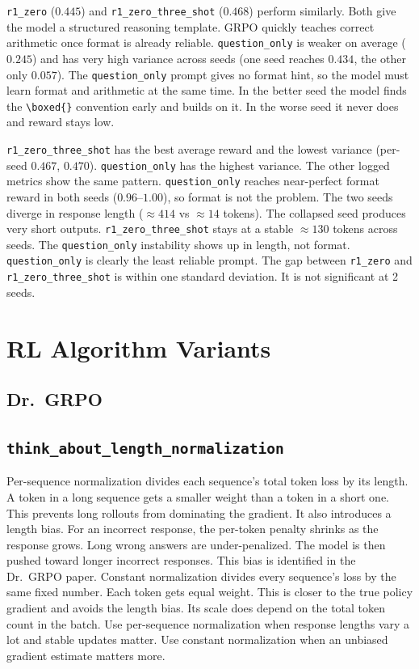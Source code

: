 \documentclass[11pt]{article}
\newcommand{\problemid}[1]{\subsection*{\nolinkurl{#1}}}
\begin{document}
\texttt{r1\_zero} ($0.445$) and \texttt{r1\_zero\_three\_shot} ($0.468$) perform
similarly. Both give the model a structured reasoning template. GRPO quickly
teaches correct arithmetic once format is already reliable.
\texttt{question\_only} is weaker on average ($0.245$) and has very high
variance across seeds (one seed reaches $0.434$, the other only $0.057$). The
\texttt{question\_only} prompt gives no format hint, so the model must learn
format and arithmetic at the same time. In the better seed the model finds the
\verb|\boxed{}| convention early and builds on it. In the worse seed it never
does and reward stays low.

\texttt{r1\_zero\_three\_shot} has the best average reward and the lowest
variance (per-seed $0.467$, $0.470$). \texttt{question\_only} has the highest
variance. The other logged metrics show the same pattern. \texttt{question\_only}
reaches near-perfect format reward in both seeds ($0.96$--$1.00$), so format is
not the problem. The two seeds diverge in response length ($\approx 414$ vs
$\approx 14$ tokens). The collapsed seed produces very short outputs.
\texttt{r1\_zero\_three\_shot} stays at a stable $\approx 130$ tokens across
seeds. The \texttt{question\_only} instability shows up in length, not format.
\texttt{question\_only} is clearly the least reliable prompt. The gap between
\texttt{r1\_zero} and \texttt{r1\_zero\_three\_shot} is within one standard
deviation. It is not significant at 2 seeds.

\section{RL Algorithm Variants}

\subsection{Dr.\ GRPO}

\problemid{think_about_length_normalization}

Per-sequence normalization divides each sequence's total token loss by its
length. A token in a long sequence gets a smaller weight than a token in a
short one. This prevents long rollouts from dominating the gradient. It also
introduces a length bias. For an incorrect response, the per-token penalty
shrinks as the response grows. Long wrong answers are under-penalized. The
model is then pushed toward longer incorrect responses. This bias is identified
in the Dr.\ GRPO paper. Constant normalization divides every sequence's loss by
the same fixed number. Each token gets equal weight. This is closer to the true
policy gradient and avoids the length bias. Its scale does depend on the total
token count in the batch. Use per-sequence normalization when response lengths
vary a lot and stable updates matter. Use constant normalization when an
unbiased gradient estimate matters more.
\end{document}
